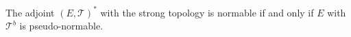 The adjoint $(E,\mathcal{T})^*$ with the strong topology is normable if and only if $E$ with $\mathcal{T}^b$ is pseudo-normable.
